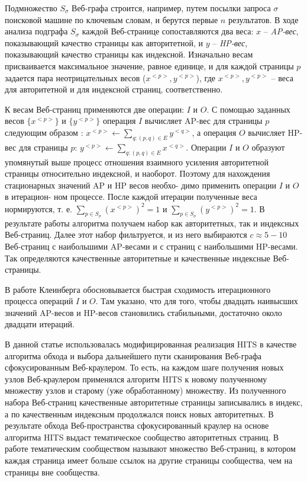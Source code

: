 Подмножество \(S_\sigma\) Веб-графа строится, например, путем посылки запроса \(\sigma\) поисковой машине по ключевым словам, и берутся первые \(n\) результатов. В ходе анализа подграфа \(S_\sigma\) каждой Веб-странице сопоставляются два веса: \(x\) -- \textit{AP-вес}, показывающий качество страницы как авторитетной, и \(y\) – \textit{HP-вес}, показывающий качество страницы как индексной. Изначально весам присваивается максимальное значение, равное единице, и для каждой страницы \(p\) задается пара неотрицательных весов (\(x^{<p>}, y^{<p>}\)), где \(x^{<p>}, y^{<p>}\) -- веса для авторитетной и для индексной страниц, соответственно.

К весам Веб-страниц применяются две операции: \(I\) и \(O\). С помощью заданных весов \(\{x^{<p>}\}\) и \(\{y^{<p>}\}\) операция \(I\) вычисляет AP-вес для страницы \(p\) следующим образом \cite{Kleinberg}: \(x^{<p>} \leftarrow \sum_{q: (p, q) \in E} y^{<q>}\), а операция \(O\) вычисляет HP-вес для страницы \(p\): \(y^{<p>} \leftarrow \sum_{q: (p, q) \in E} x^{<q>}\). Операции \(I\) и \(O\) образуют упомянутый выше процесс отношения взаимного усиления авторитетной страницы относительно индексной, и наоборот. Поэтому для нахождения стационарных значений AP и HP весов необхо- димо применить операции \(I\) и \(O\) в итерацион- ном процессе. После каждой итерации полученные веса нормируются, т. е. \(\sum_{p \in S_\sigma} (x^{<p>})^2 = 1\) и  \(\sum_{p \in S_\sigma} (y^{<p>})^2 = 1\). В результате работы алгоритма получаем набор как авторитетных, так и индексных Веб-страниц. Далее этот набор фильтруется, и из него выбираются \(c \approx 5-10\) Веб-страниц с наибольшими AP-весами и с страниц с наибольшими HP-весами. Так определяются качественные авторитетные и качественные индексные Веб-страницы.

В работе Клеинберга \cite{Kleinberg} обосновывается быстрая сходимость итерационного процесса операций \(I\) и \(O\). Там указано, что для того, чтобы двадцать наивысших значений AP-весов и HP-весов становились стабильными, достаточно около двадцати итераций.

В данной статье использовалась модифицированная реализация HITS в качестве алгоритма обхода и выбора дальнейшего пути сканирования Веб-графа сфокусированным Веб-краулером. То есть, на каждом шаге получения новых узлов Веб-краулером применялся алгоритм HITS к новому полученному множеству узлов и старому (уже обработанному) множеству. Из полученного набора Веб-страниц качественные авторитетные страницы записывались в индекс, а по качественным индексным продолжался поиск новых авторитетных. В результате обхода Веб-пространства сфокусированный краулер на основе алгоритма HITS выдаст тематическое сообщество авторитетных страниц. В работе \cite{GibsonKleinbergRaghavan} тематическим сообществом называют множество Веб-страниц, в котором каждая страница имеет больше ссылок на другие страницы сообщества, чем на страницы вне сообщества.

